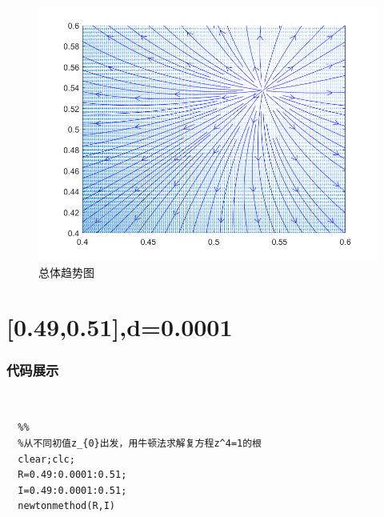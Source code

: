 \documentclass[UTF8,a4paper,10pt]{ctexart}
\begin{document}
 \newline
	\begin{figure}[!htbp]
		\centering
		\includegraphics[width=1\textwidth,height=1\textwidth]{pictures/2_3.png}
		\caption{总体趋势图} \label{2_3}
	\end{figure}


\section{[0.49,0.51]\times [0.49,0.51],d=0.0001}
\subsubsection{代码展示}
~\\
\lstset{language=matlab}
\begin{lstlisting}
  %%
  %从不同初值z_{0}出发，用牛顿法求解复方程z^4=1的根
  clear;clc;
  R=0.49:0.0001:0.51;
  I=0.49:0.0001:0.51;
  newtonmethod(R,I)
\end{lstlisting}
\end{document}
